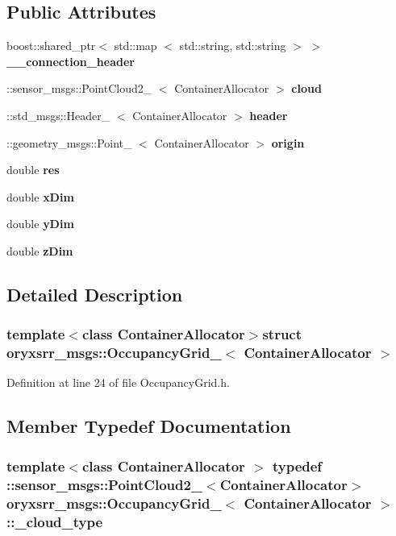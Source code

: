 \subsection*{\-Public \-Attributes}
\begin{DoxyCompactItemize}
\item 
boost\-::shared\-\_\-ptr$<$ std\-::map\*
$<$ std\-::string, std\-::string $>$ $>$ {\bf \-\_\-\-\_\-connection\-\_\-header}
\item 
\-::sensor\-\_\-msgs\-::\-Point\-Cloud2\-\_\-\*
$<$ \-Container\-Allocator $>$ {\bf cloud}
\item 
\-::std\-\_\-msgs\-::\-Header\-\_\-\*
$<$ \-Container\-Allocator $>$ {\bf header}
\item 
\-::geometry\-\_\-msgs\-::\-Point\-\_\-\*
$<$ \-Container\-Allocator $>$ {\bf origin}
\item 
double {\bf res}
\item 
double {\bf x\-Dim}
\item 
double {\bf y\-Dim}
\item 
double {\bf z\-Dim}
\end{DoxyCompactItemize}


\subsection{\-Detailed \-Description}
\subsubsection*{template$<$class Container\-Allocator$>$struct oryxsrr\-\_\-msgs\-::\-Occupancy\-Grid\-\_\-$<$ Container\-Allocator $>$}



\-Definition at line 24 of file \-Occupancy\-Grid.\-h.



\subsection{\-Member \-Typedef \-Documentation}
\subsubsection[{\-\_\-cloud\-\_\-type}]{\setlength{\rightskip}{0pt plus 5cm}template$<$class Container\-Allocator $>$ typedef \-::sensor\-\_\-msgs\-::\-Point\-Cloud2\-\_\-$<$\-Container\-Allocator$>$ {\bf oryxsrr\-\_\-msgs\-::\-Occupancy\-Grid\-\_\-}$<$ \-Container\-Allocator $>$\-::{\bf \-\_\-cloud\-\_\-type}}\label{structoryxsrr__msgs_1_1OccupancyGrid___af06470ebde1676ca43ef0c82ff827bc6}


